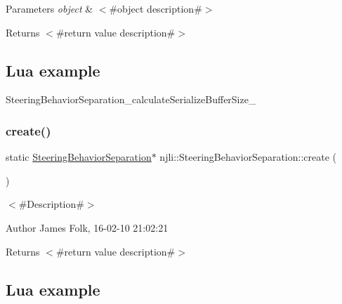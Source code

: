 \begin{DoxyParams}{Parameters}
{\em object} & $<$\#object description\#$>$\\
\hline
\end{DoxyParams}
\begin{DoxyReturn}{Returns}
$<$\#return value description\#$>$
\end{DoxyReturn}
\hypertarget{classnjli_1_1_steering_behavior_wander_ex1}{}\subsection{Lua example}\label{classnjli_1_1_steering_behavior_wander_ex1}

\begin{DoxyCodeInclude}
\end{DoxyCodeInclude}
Steering\+Behavior\+Separation\+\_\+calculate\+Serialize\+Buffer\+Size\+\_\+ \mbox{\label{classnjli_1_1_steering_behavior_separation_ad8c345240a621873391015e2791acbeb}} 
\subsubsection{\texorpdfstring{create()}{create()}\hspace{0.1cm}{\footnotesize\ttfamily [1/2]}}
{\footnotesize\ttfamily static \mbox{\hyperlink{classnjli_1_1_steering_behavior_separation}{Steering\+Behavior\+Separation}}$\ast$ njli\+::\+Steering\+Behavior\+Separation\+::create (\begin{DoxyParamCaption}{ }\end{DoxyParamCaption})\hspace{0.3cm}{\ttfamily [static]}}



$<$\#\+Description\#$>$ 

\begin{DoxyAuthor}{Author}
James Folk, 16-\/02-\/10 21\+:02\+:21
\end{DoxyAuthor}
\begin{DoxyReturn}{Returns}
$<$\#return value description\#$>$
\end{DoxyReturn}
\hypertarget{classnjli_1_1_steering_behavior_wander_ex1}{}\subsection{Lua example}\label{classnjli_1_1_steering_behavior_wander_ex1}

